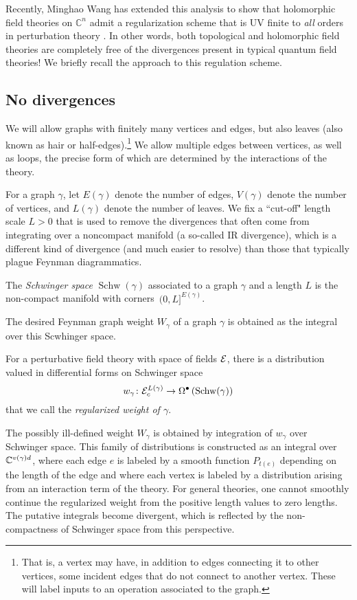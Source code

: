 \documentclass[11pt]{amsart}
\def\C{{\mathbb{C}}}
\renewcommand{\op}{\operatorname}
\begin{document}
Recently, Minghao Wang has extended this analysis to show that holomorphic field theories on $\C^n$ admit a regularization scheme that is UV finite to \textit{all} orders in perturbation theory \cite{Wang}.
In other words, both topological and holomorphic field theories are completely free of the divergences present in typical quantum field theories!
We briefly recall the approach to this regulation scheme.

\subsection{No divergences}

We will allow graphs with finitely many vertices and edges, 
but also leaves (also known as hair or half-edges).\footnote{That is, a vertex may have, in addition to edges connecting it to other vertices, some incident edges that do not connect to another vertex. 
These will label inputs to an operation associated to the graph.}
We allow multiple edges between vertices, as well as loops, the precise form of which are determined by the interactions of the theory.

For a graph $\gamma$, let $E(\gamma)$ denote the number of edges,
$V(\gamma)$ denote the number of vertices,
and $L(\gamma)$ denote the number of leaves.
We fix a ``cut-off" length scale $L > 0$ that is used to remove the divergences that often come from integrating over a noncompact manifold (a so-called IR divergence), 
which is a different kind of divergence (and much easier to resolve) than those that typically plague Feynman diagrammatics.

\begin{dfn}
The {\em Schwinger space} $\op{Schw}(\gamma)$ associated to a graph $\gamma$ and a length $L$ is the non-compact manifold with corners~$(0,L]^{E(\gamma)}$.
\end{dfn}

The desired Feynman graph weight $W_\gamma$ of a graph $\gamma$ is obtained as the integral over this Scwhinger space. 

\begin{dfn}
For a perturbative field theory with space of fields $\mathcal E$, there is a distribution valued in differential forms on Schwinger space
\[
w_{\gamma} \colon \cE^{L(\gamma)}_c \to \Omega^\bu \left( \op{Schw}(\gamma) \right)
\]
that we call the {\em regularized weight of $\gamma$}.
\end{dfn}

The possibly ill-defined weight $W_\gamma$ is obtained by integration of $w_\gamma$ over Schwinger space.
This family of distributions is constructed as an integral over $\mathbb C^{v(\gamma) d}$,
where each edge $e$ is labeled by a smooth function $P_{t(e)}$ depending on the length of the edge and where each vertex is labeled by a distribution arising from an interaction term of the theory.
For general theories, one cannot smoothly continue the regularized weight from the positive length values to zero lengths.
The putative integrals become divergent, which is reflected by the non-compactness of Schwinger space from this perspective.
\end{document}
